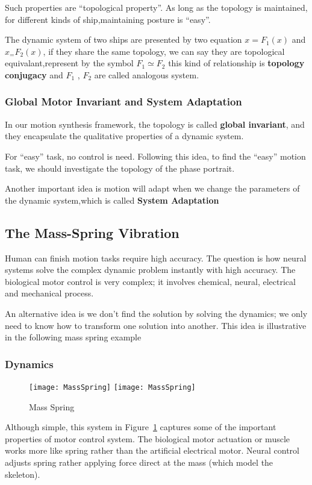 Such properties are “topological property”.
As long as the topology is maintained, for different kinds of ship,maintaining posture is “easy”.

The dynamic system of two ships are presented by two equation $x=F_1(x)$ and $x_=F_2(x)$,
if they share the same topology, we can say they are topological equivalant,represent by the symbol $F_1 \simeq F_2$
this kind of relationship is \textbf{topology conjugacy}
and $F_1$ , $F_2$ are called analogous system.



\subsubsection*{Global Motor Invariant and System Adaptation}
In our motion synthesis framework, the topology is called \textbf{global invariant}, and they encapsulate the qualitative properties of a dynamic system.

For “easy” task, no control is need.
Following this idea, to find the “easy” motion task, we should investigate the topology of the phase portrait.

Another important idea is motion will adapt when we change the parameters of the dynamic system,which is called \textbf{System Adaptation}


\subsection{The Mass-Spring Vibration}
Human can finish motion tasks require high accuracy.
The question is how neural systems solve the complex dynamic problem instantly with high accuracy.
The biological motor control is very complex; it involves chemical, neural, electrical and mechanical process. 

An alternative idea is we don’t find the solution by solving the dynamics; we only need to know how to transform one solution into another.
This idea is illustrative in the following mass spring example

\subsubsection*{Dynamics}

\begin{figure}[!htbp]
  \begin{center}
    \leavevmode
    \ifpdf
      \texttt{[image: MassSpring]}
    \else
      \texttt{[image: MassSpring]}
    \fi
    \caption{Mass Spring}
    \label{fig:massspring}
  \end{center}
\end{figure}
Although simple, this system in Figure~\ref{fig:massspring} captures some of the important properties of motor control system.
The biological motor actuation or muscle works more like spring rather than the artificial electrical motor. 
Neural control adjusts spring rather applying force direct at the mass (which model the skeleton).


